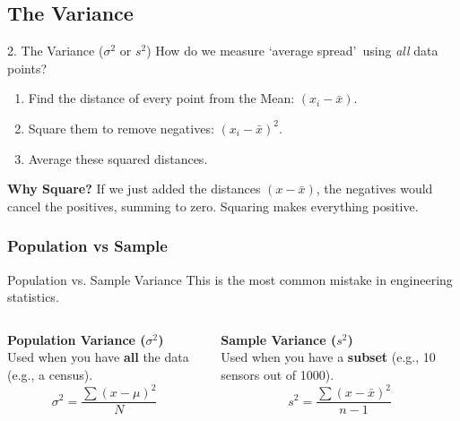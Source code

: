 \subsection{The Variance}
\begin{frame}{2. The Variance ($\sigma^2$ or $s^2$)}
    How do we measure \lq average spread\rq\ using \textit{all} data points?
     
    \begin{enumerate}
        \item Find the distance of every point from the Mean: $(x_i - \bar{x})$.
        \item Square them to remove negatives: $(x_i - \bar{x})^2$.
        \item Average these squared distances.
    \end{enumerate}

    \textbf{Why Square?} 
    If we just added the distances $(x - \bar{x})$, the negatives would cancel the positives, summing to zero. Squaring makes everything positive.
\end{frame}

\subsubsection{Population vs Sample}
\begin{frame}{Population vs. Sample Variance}
    This is the most common mistake in engineering statistics.
    
    \begin{columns}
        \textbf{Population Variance ($\sigma^2$)} \\
        Used when you have \textbf{all} the data (e.g., a census).
        \[ \sigma^2 = \frac{\sum (x - \mu)^2}{N} \]
        
        \textbf{Sample Variance ($s^2$)} \\
        Used when you have a \textbf{subset} (e.g., 10 sensors out of 1000).
        \[ s^2 = \frac{\sum (x - \bar{x})^2}{n-1} \]
    \end{columns}
\end{frame}

